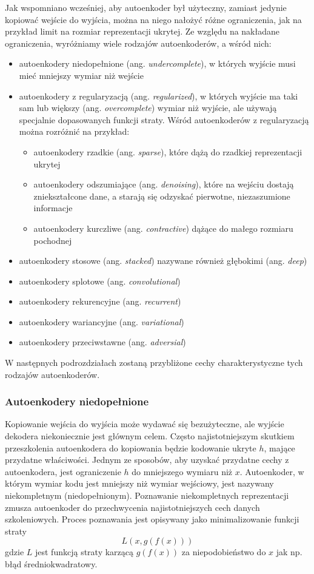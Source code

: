 \documentclass[12pt]{mwbk}
\theoremstyle{plain}
\theoremstyle{definition}
\theoremstyle{remark}
\begin{document}
Jak wspomniano wcześniej, aby autoenkoder był użyteczny, zamiast jedynie kopiować wejście do wyjścia, można na niego nałożyć różne ograniczenia, jak na przykład limit na rozmiar reprezentacji ukrytej. Ze względu na nakładane ograniczenia, wyróżniamy wiele rodzajów autoenkoderów, a wśród nich:
\begin{itemize}
	\item  autoenkodery niedopełnione (ang. \emph{undercomplete}), w których wyjście musi mieć mniejszy wymiar niż wejście
 \item autoenkodery z regularyzacją (ang. \emph{regularized}), w których wyjście ma taki sam lub większy (ang. \emph{overcomplete}) wymiar niż wyjście, ale używają specjalnie dopasowanych funkcji straty. Wśród autoenkoderów z regularyzacją można rozróżnić na przykład:
 \begin{itemize}
 	\item autoenkodery rzadkie (ang. \emph{sparse}), które dążą do rzadkiej reprezentacji ukrytej
 	\item autoenkodery odszumiające (ang. \emph{denoising}), które na wejściu dostają zniekształcone dane, a starają się odzyskać pierwotne, niezaszumione informacje
 	\item autoenkodery kurczliwe (ang. \emph{contractive}) dążące do małego rozmiaru pochodnej
 \end{itemize}
\item autoenkodery stosowe (ang. \emph{stacked}) nazywane również głębokimi (ang. \emph{deep})
\item autoenkodery splotowe (ang. \emph{convolutional})
\item autoenkodery rekurencyjne (ang. \emph{recurrent})
\item autoenkodery wariancyjne (ang. \emph{variational})
\item autoenkodery przeciwstawne (ang. \emph{adversial})
\end{itemize}
W następnych podrozdziałach zostaną przybliżone cechy charakterystyczne tych rodzajów autoenkoderów.

\subsubsection{Autoenkodery niedopełnione}

Kopiowanie wejścia do wyjścia może wydawać się bezużyteczne, ale wyjście dekodera niekoniecznie jest głównym celem. Często najistotniejszym skutkiem przeszkolenia autoenkodera do kopiowania będzie kodowanie ukryte $h$, mające przydatne właściwości.
Jednym ze sposobów, aby uzyskać przydatne cechy z autoenkodera, jest ograniczenie $h$ do mniejszego wymiaru niż $x$. Autoenkoder, w którym wymiar kodu jest mniejszy niż wymiar wejściowy, jest nazywany niekompletnym (niedopełnionym).
Poznawanie niekompletnych reprezentacji zmusza autoenkoder do przechwycenia najistotniejszych cech danych szkoleniowych.
Proces poznawania jest opisywany  jako minimalizowanie funkcji straty
$$L(x, g(f(x)))$$
gdzie $L$ jest funkcją straty karzącą $g(f(x))$ za niepodobieństwo do $x$ jak np. błąd średniokwadratowy.
\end{document}
